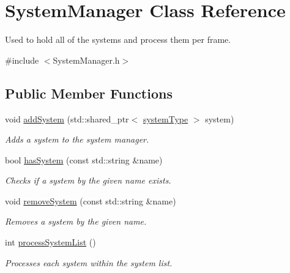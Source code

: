 \hypertarget{class_system_manager}{\section{System\-Manager Class Reference}
\label{d6/d8f/class_system_manager}
}


Used to hold all of the systems and process them per frame.  




{\ttfamily \#include $<$System\-Manager.\-h$>$}

\subsection*{Public Member Functions}
\begin{DoxyCompactItemize}
\item 
\hypertarget{class_system_manager_ae839969e1eda73bf39c29948bcc3fde2}{void \hyperlink{class_system_manager_ae839969e1eda73bf39c29948bcc3fde2}{add\-System} (std\-::shared\-\_\-ptr$<$ \hyperlink{_abstract_system_8h_a1411f3bb7eaf6ed11af20ec634ed4a5e}{system\-Type} $>$ system)}\label{d6/d8f/class_system_manager_ae839969e1eda73bf39c29948bcc3fde2}

\begin{DoxyCompactList}\small\item\em Adds a system to the system manager. \end{DoxyCompactList}\item 
\hypertarget{class_system_manager_aa510ccbb5a6af14fe558cc14237ec692}{bool \hyperlink{class_system_manager_aa510ccbb5a6af14fe558cc14237ec692}{has\-System} (const std\-::string \&name)}\label{d6/d8f/class_system_manager_aa510ccbb5a6af14fe558cc14237ec692}

\begin{DoxyCompactList}\small\item\em Checks if a system by the given name exists. \end{DoxyCompactList}\item 
\hypertarget{class_system_manager_a70a94ac38481c98cef33216ab335de6c}{void \hyperlink{class_system_manager_a70a94ac38481c98cef33216ab335de6c}{remove\-System} (const std\-::string \&name)}\label{d6/d8f/class_system_manager_a70a94ac38481c98cef33216ab335de6c}

\begin{DoxyCompactList}\small\item\em Removes a system by the given name. \end{DoxyCompactList}\item 
\hypertarget{class_system_manager_a239491cad9990ede93d3bad25b381602}{int \hyperlink{class_system_manager_a239491cad9990ede93d3bad25b381602}{process\-System\-List} ()}\label{d6/d8f/class_system_manager_a239491cad9990ede93d3bad25b381602}

\begin{DoxyCompactList}\small\item\em Processes each system within the system list. \end{DoxyCompactList}\end{DoxyCompactItemize}
